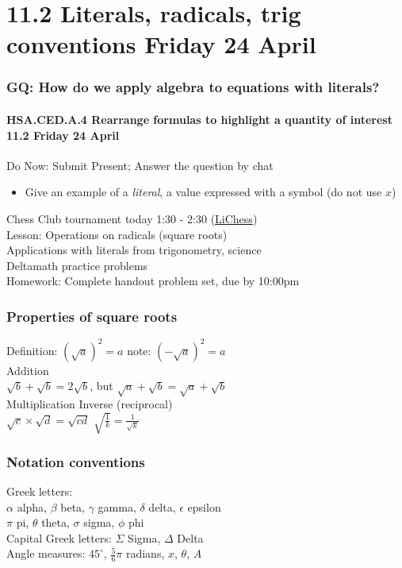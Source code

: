 \documentclass{beamer}
\begin{document}
\section{11.2 Literals, radicals, trig conventions Friday 24 April} 
\frame
{
  \frametitle{GQ: How do we apply algebra to equations with literals?}
  \framesubtitle{HSA.CED.A.4 Rearrange formulas to highlight a quantity of interest \hfill \alert{11.2 Friday 24 April}}

  \begin{block}{Do Now: Submit Present; Answer the question by chat}
    \begin{itemize}
      \item Give an example of a \emph{literal}, a value expressed with a symbol (do not use $x$)
    \end{itemize}

    \end{block}
    Chess Club tournament today 1:30 - 2:30 (\href{http://LiChess.org}{LiChess}) \\[0.25cm]
    Lesson: Operations on radicals (square roots)\\
    Applications with literals from trigonometry, science\\[0.25cm]
    Deltamath practice problems \\[0.25cm]
    Homework: Complete handout problem set, due by 10:00pm}

\frame
{
  \frametitle{Properties of square roots}

  \Large{
  Definition: $(\sqrt{a})^2=a$ \hfill note: $(-\sqrt{a})^2=a$ \\[1cm]

  Addition \\
  $\sqrt{b}+\sqrt{b}=2\sqrt{b}$, \hfill but $\sqrt{a}+\sqrt{b}=\sqrt{a}+\sqrt{b}$ \\[1cm]
  Multiplication \hfill  Inverse (reciprocal)\\
  $\sqrt{c} \times \sqrt{d}=\sqrt{cd}$ \hfill 
  $\displaystyle \sqrt{\frac{1}{k}}= \frac{1}{\sqrt{k}}$\\[0.5cm]
  
}
}

\frame
{
  \frametitle{Notation conventions}

  \Large{
  Greek letters: \\[0.25cm]
  $\alpha$ alpha, $\beta$ beta, $\gamma$ gamma, $\delta$ delta, $\epsilon$ epsilon\\[0.25cm]
  $\pi$ pi, $\theta$ theta, $\sigma$ sigma, $\phi$ phi \\[0.25cm]
  Capital Greek letters: $\Sigma$ Sigma, $\Delta$ Delta\\[1cm]
  Angle measures: 
  $45^\circ$, $\displaystyle \frac{5}{6}\pi$ radians, $x$, $\theta$, $A$

}
}
\end{document}
